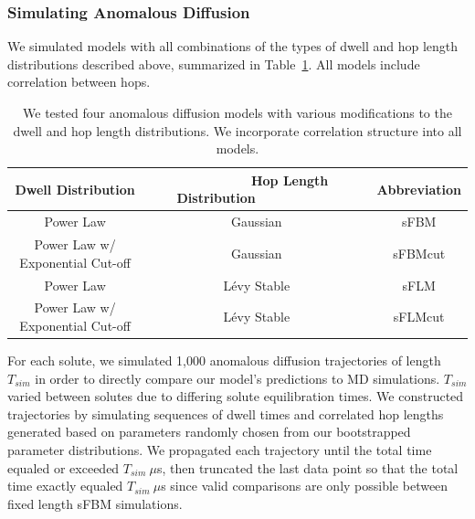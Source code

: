 \documentclass[aps,pre,preprint,groupedaddress,longbibliography]{revtex4-2}
\begin{document}
  \subsubsection*{Simulating Anomalous Diffusion}

  We simulated models with all combinations of the types of dwell and hop length
  distributions described above, summarized in Table~\ref{table:anomalous_models}.
  All models include correlation between hops.

  \begin{table}[!htb]
	  \centering
	  \begin{tabular}{ccc}
            \hline
	  \hline
	  Dwell Distribution                & ~~~~~~~~~Hop Length Distribution~~~~~~~~~~~ & Abbreviation \\
	  \hline
      Power Law                         & Gaussian                & sFBM         \\
      Power Law w/ Exponential Cut-off  & Gaussian                & sFBMcut      \\
      Power Law                         & L\'evy Stable           & sFLM         \\
      Power Law w/ Exponential Cut-off  & L\'evy Stable           & sFLMcut      \\
	  \hline
          \hline
	  \end{tabular}
	  \caption{We tested four anomalous diffusion models with various modifications 
	  to the dwell and hop length distributions. We incorporate correlation structure
	  into all models.}\label{table:anomalous_models}
          
 \end{table}

  For each solute, we simulated 1,000 anomalous diffusion trajectories of length
  $T_{sim}$ in order to directly compare our model's predictions to MD simulations.
  $T_{sim}$ varied between solutes due to differing solute equilibration times. We constructed 
  trajectories by simulating sequences of dwell times and correlated hop lengths
  generated based on parameters randomly chosen from our bootstrapped parameter 
  distributions. We propagated each trajectory until the total time equaled or 
  exceeded $T_{sim}~ \mu$s, then truncated the last data point so that the total 
  time exactly equaled $T_{sim}~ \mu$s since valid comparisons are only possible 
  between fixed length sFBM simulations. 
  
\end{document}
